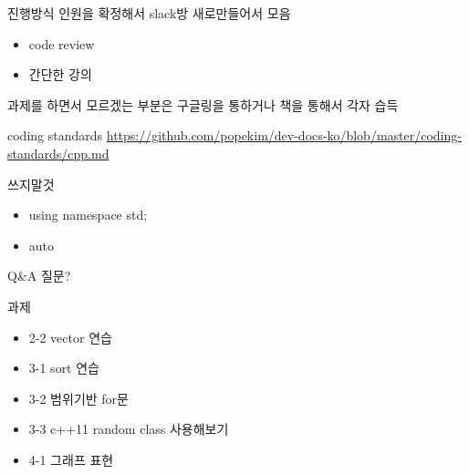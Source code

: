 \documentclass[10pt]{beamer}
\begin{document}
\begin{frame}{진행방식}
    인원을 확정해서 slack방 새로만들어서 모음
        


    \begin{itemize}
        \item code review
        \item 간단한 강의
    \end{itemize}
    과제를 하면서 모르겠는 부분은 구글링을 통하거나 책을 통해서 각자 습득
\end{frame}    

\begin{frame}{coding standards}
    \url{https://github.com/popekim/dev-docs-ko/blob/master/coding-standards/cpp.md}
    
    쓰지말것
    \begin{itemize}
        \item using namespace  std;
        \item auto
    \end{itemize}
\end{frame}    


\begin{frame}{Q\&A}
    질문?
\end{frame}


\begin{frame}{과제}
    \begin{itemize}
        \item 2-2 vector 연습
        \item 3-1 sort 연습 
        \item 3-2 범위기반 for문
        \item 3-3 c++11 random class 사용해보기
        \item 4-1 그래프 표현
    \end{itemize}
\end{frame}    
\end{document}
